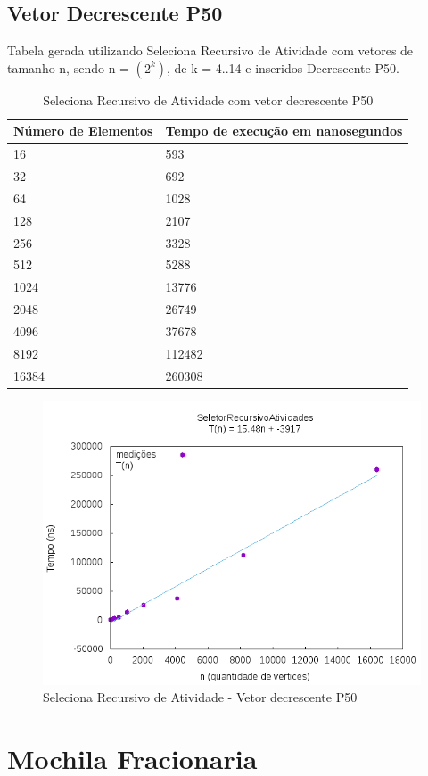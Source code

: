 \documentclass[12pt,a4paper,twoside]{report}
\begin{document}
\subsection{Vetor Decrescente P50}
Tabela gerada utilizando Seleciona Recursivo de Atividade com vetores de tamanho n, sendo n = $(2^k)$, de k = 4..14 e inseridos Decrescente P50.
\begin{table}[H]
\centering
\caption{Seleciona Recursivo de Atividade com vetor decrescente P50}
\label{my-label}
\begin{tabular}{|l|l|}
\hline
\multicolumn{1}{|c|}{\textbf{Número de Elementos}} & \multicolumn{1}{c|}{\textbf{Tempo de execução em nanosegundos}} \\ \hline
16 & 593 \\ \hline
32 & 692 \\ \hline
64 & 1028 \\ \hline
128 & 2107 \\ \hline
256 & 3328 \\ \hline
512 & 5288 \\ \hline
1024 & 13776 \\ \hline
2048 & 26749 \\ \hline
4096 & 37678 \\ \hline
8192 & 112482 \\ \hline
16384 & 260308 \\ \hline
\end{tabular}
\end{table}

\begin{figure}[H]
    \centering
    \includegraphics[width=0.7\linewidth]{graficos/SeletorRecursivoAtividades/Decrescente P50/SelecionaAleatorizado.png}
  \caption{Seleciona Recursivo de Atividade - Vetor decrescente P50}
\end{figure}


\section{Mochila Fracionaria}
\end{document}

